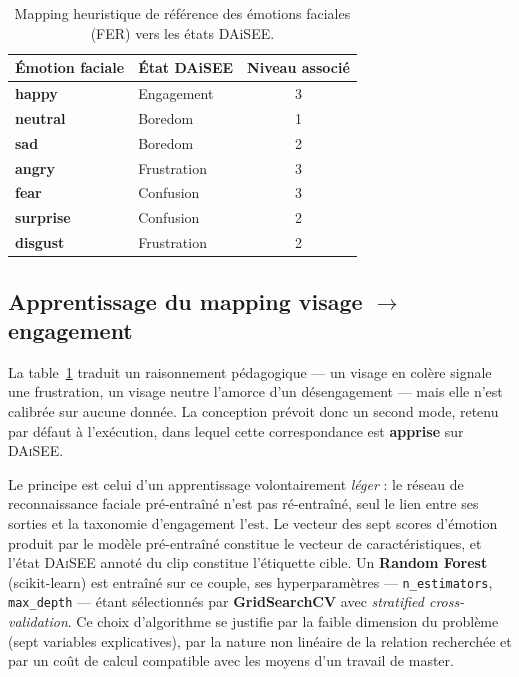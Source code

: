 \begin{table}[H]
\centering
\renewcommand{\arraystretch}{1.15}
\begin{tabular}{>{\bfseries}l l c}
\toprule
Émotion faciale & État DAiSEE & Niveau associé \\
\midrule
happy    & Engagement  & 3 \\
neutral  & Boredom     & 1 \\
sad      & Boredom     & 2 \\
angry    & Frustration & 3 \\
fear     & Confusion   & 3 \\
surprise & Confusion   & 2 \\
disgust  & Frustration & 2 \\
\bottomrule
\end{tabular}
\caption{Mapping heuristique de référence des émotions faciales (FER) vers les
états DAiSEE.}
\label{tab:fer-mapping}
\end{table}

\subsection{Apprentissage du mapping visage $\rightarrow$ engagement}
\label{subsec:fer-appris}

La table~\ref{tab:fer-mapping} traduit un raisonnement pédagogique — un visage en
colère signale une frustration, un visage neutre l'amorce d'un désengagement —
mais elle n'est calibrée sur aucune donnée. La conception prévoit donc un second
mode, retenu par défaut à l'exécution, dans lequel cette correspondance est
\textbf{apprise} sur \textsc{DAiSEE}.

Le principe est celui d'un apprentissage volontairement \emph{léger} : le réseau
de reconnaissance faciale pré-entraîné n'est pas ré-entraîné, seul le lien entre
ses sorties et la taxonomie d'engagement l'est. Le vecteur des sept scores
d'émotion produit par le modèle pré-entraîné constitue le vecteur de
caractéristiques, et l'état \textsc{DAiSEE} annoté du clip constitue l'étiquette
cible. Un \textbf{Random Forest} (scikit-learn) est entraîné sur ce couple,
ses hyperparamètres — \texttt{n\_estimators}, \texttt{max\_depth} — étant sélectionnés
par \textbf{GridSearchCV} avec \emph{stratified cross-validation}. Ce choix
d'algorithme se justifie par la faible dimension du problème (sept variables
explicatives), par la nature non linéaire de la relation recherchée et par un coût
de calcul compatible avec les moyens d'un travail de master.

